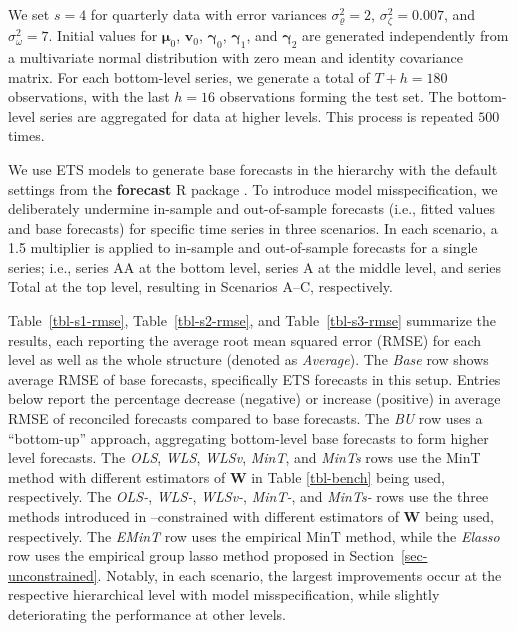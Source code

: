 \documentclass[
  11pt]{article}
\begin{document}
We set \(s = 4\) for quarterly data with error variances
\(\sigma_{\varrho}^2=2\), \(\sigma_\zeta^2=0.007\), and
\(\sigma_\omega^2=7\). Initial values for \(\bm{\mu}_0\), \(\bm{v}_0\),
\(\bm{\gamma}_0\), \(\bm{\gamma}_1\), and \(\bm{\gamma}_2\) are
generated independently from a multivariate normal distribution with
zero mean and identity covariance matrix. For each bottom-level series,
we generate a total of \(T+h = 180\) observations, with the last
\(h = 16\) observations forming the test set. The bottom-level series
are aggregated for data at higher levels. This process is repeated
\(500\) times.

We use ETS models to generate base forecasts in the hierarchy with the
default settings from the \textbf{forecast} R package
\citep{Hyndman2023-fc}. To introduce model misspecification, we
deliberately undermine in-sample and out-of-sample forecasts (i.e.,
fitted values and base forecasts) for specific time series in three
scenarios. In each scenario, a 1.5 multiplier is applied to in-sample
and out-of-sample forecasts for a single series; i.e., series AA at the
bottom level, series A at the middle level, and series Total at the top
level, resulting in Scenarios A--C, respectively.

Table~\ref{tbl-s1-rmse}, Table~\ref{tbl-s2-rmse}, and
Table~\ref{tbl-s3-rmse} summarize the results, each reporting the
average root mean squared error (RMSE) for each level as well as the
whole structure (denoted as \emph{Average}). The \emph{Base} row shows
average RMSE of base forecasts, specifically ETS forecasts in this
setup. Entries below report the percentage decrease (negative) or
increase (positive) in average RMSE of reconciled forecasts compared to
base forecasts. The \emph{BU} row uses a ``bottom-up'' approach,
aggregating bottom-level base forecasts to form higher level forecasts.
The \emph{OLS}, \emph{WLS}, \emph{WLSv}, \emph{MinT}, and \emph{MinTs}
rows use the MinT method with different estimators of \(\bm{W}\) in
Table \ref{tbl-bench} being used, respectively. The \emph{OLS-},
\emph{WLS-}, \emph{WLSv-}, \emph{MinT-}, and \emph{MinTs-} rows use the
three methods introduced in \citet{sec}--constrained with different
estimators of \(\bm{W}\) being used, respectively. The \emph{EMinT} row
uses the empirical MinT method, while the \emph{Elasso} row uses the
empirical group lasso method proposed in
Section~\ref{sec-unconstrained}. Notably, in each scenario, the largest
improvements occur at the respective hierarchical level with model
misspecification, while slightly deteriorating the performance at other
levels.
\end{document}
